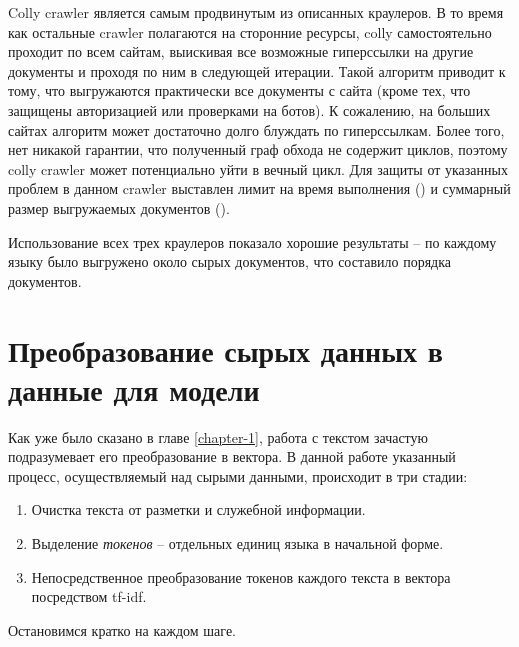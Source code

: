 Colly \gls{crawler} \cite{cite:colly} является самым продвинутым из описанных краулеров.
В то время как остальные \gls{crawler} полагаются на сторонние ресурсы, colly самостоятельно проходит по всем сайтам, выискивая все возможные гиперссылки на другие документы и проходя по ним в следующей итерации.
Такой алгоритм приводит к тому, что выгружаются практически все документы с сайта (кроме тех, что защищены авторизацией или проверками на ботов).
К сожалению, на больших сайтах алгоритм может достаточно долго блуждать по гиперссылкам.
Более того, нет никакой гарантии, что полученный граф обхода не содержит циклов, поэтому colly crawler может потенциально уйти в вечный цикл.
Для защиты от указанных проблем в данном \gls{crawler} выставлен лимит на время выполнения (\collyTimeLimit) и суммарный размер выгружаемых документов (\collySizeLimit).

Использование всех трех краулеров показало хорошие результаты -- по каждому языку было выгружено около \datasetSize сырых документов, что составило порядка \datasetDocs документов.

\section{Преобразование сырых данных в данные для модели}
\label{sec:preprocessing}
Как уже было сказано в главе \ref{chapter-1}, работа с текстом зачастую подразумевает его преобразование в вектора.
В данной работе указанный процесс, осуществляемый над сырыми данными, происходит в три стадии:
\begin{enumerate}
    \item Очистка текста от разметки и служебной информации.
    \item Выделение \textit{токенов} -- отдельных единиц языка в начальной форме.
    \item Непосредственное преобразование токенов каждого текста в вектора посредством \acrshort{tf-idf}.
\end{enumerate}
Остановимся кратко на каждом шаге.
